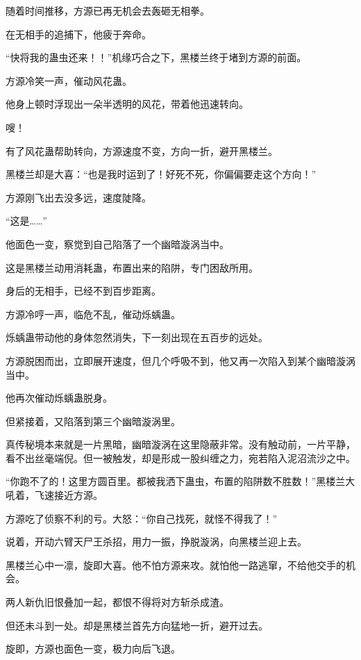 
\begin{this_body}

随着时间推移，方源已再无机会去轰砸无相拳。

在无相手的追捕下，他疲于奔命。

“快将我的蛊虫还来！！”机缘巧合之下，黑楼兰终于堵到方源的前面。

方源冷笑一声，催动风花蛊。

他身上顿时浮现出一朵半透明的风花，带着他迅速转向。

嗖！

有了风花蛊帮助转向，方源速度不变，方向一折，避开黑楼兰。

黑楼兰却是大喜：“也是我时运到了！好死不死，你偏偏要走这个方向！”

方源刚飞出去没多远，速度陡降。

“这是……”

他面色一变，察觉到自己陷落了一个幽暗漩涡当中。

这是黑楼兰动用消耗蛊，布置出来的陷阱，专门困敌所用。

身后的无相手，已经不到百步距离。

方源冷哼一声，临危不乱，催动烁蝺蛊。

烁蝺蛊带动他的身体忽然消失，下一刻出现在五百步的远处。

方源脱困而出，立即展开速度，但几个呼吸不到，他又再一次陷入到某个幽暗漩涡当中。

他再次催动烁蝺蛊脱身。

但紧接着，又陷落到第三个幽暗漩涡里。

真传秘境本来就是一片黑暗，幽暗漩涡在这里隐蔽非常。没有触动前，一片平静，看不出丝毫端倪。但一被触发，却是形成一股纠缠之力，宛若陷入泥沼流沙之中。

“你跑不了的！这里方圆百里。都被我洒下蛊虫，布置的陷阱数不胜数！”黑楼兰大吼着，飞速接近方源。

方源吃了侦察不利的亏。大怒：“你自己找死，就怪不得我了！”

说着，开动六臂天尸王杀招，用力一振，挣脱漩涡，向黑楼兰迎上去。

黑楼兰心中一凛，旋即大喜。他不怕方源来攻。就怕他一路逃窜，不给他交手的机会。

两人新仇旧恨叠加一起，都恨不得将对方斩杀成渣。

但还未斗到一处。却是黑楼兰首先方向猛地一折，避开过去。

旋即，方源也面色一变，极力向后飞退。


\end{this_body}
